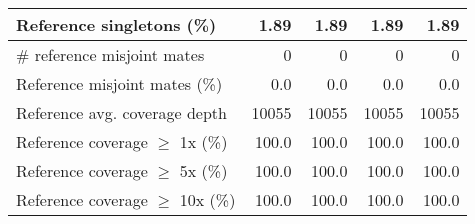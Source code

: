 \documentclass[12pt,a4paper]{article}
\begin{document}
\begin{table}[ht]
\begin{center}
\begin{tabular}{|l*{4}{|r}|}
Reference singletons (\%) & 1.89 & 1.89 & 1.89 & 1.89 \\ \hline
\# reference misjoint mates & 0 & 0 & 0 & 0 \\ \hline
Reference misjoint mates (\%) & 0.0 & 0.0 & 0.0 & 0.0 \\ \hline
Reference avg. coverage depth & 10055 & 10055 & 10055 & 10055 \\ \hline
Reference coverage $\geq$ 1x (\%) & 100.0 & 100.0 & 100.0 & 100.0 \\ \hline
Reference coverage $\geq$ 5x (\%) & 100.0 & 100.0 & 100.0 & 100.0 \\ \hline
Reference coverage $\geq$ 10x (\%) & 100.0 & 100.0 & 100.0 & 100.0 \\ \hline
\end{tabular}
\end{center}
\end{table}
\end{document}
